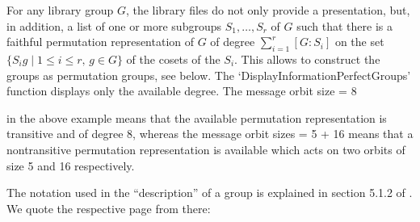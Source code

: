 For any library  group  $G$, the library    files do not  only provide  a
presentation, but, in  addition, a list  of  one or more subgroups  $S_1,
\ldots,  S_r$  of   $G$ such   that   there is  a   faithful  permutation
representation  of $G$ of degree  $\sum_{i=1}^{r} [G:S_i]$ on the set $\{
S_i g \mid 1 \leq i \leq  r, \, g \in  G \}$ of  the cosets of the $S_i$.
This allows to construct the groups as permutation groups, see below. The
`DisplayInformationPerfectGroups'  function  displays  only the available
degree. The message
\begintt
    orbit size = 8
\endtt

in the above example means  that the available permutation representation
is transitive and of degree 8, whereas the message
\begintt
    orbit sizes = 5 + 16
\endtt
means that a nontransitive  permutation representation is available which
acts on two orbits of size 5 and 16 respectively.

The notation   used in the  ``description'' of  a  group  is explained in
section 5.1.2 of \cite{HoltPlesken89}. We  quote the respective page from
there:

